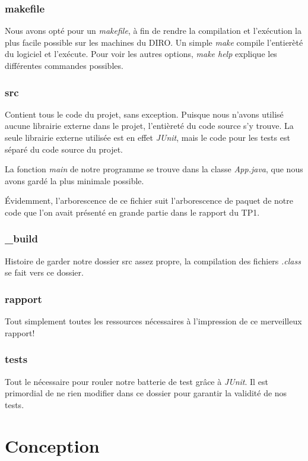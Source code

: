 \documentclass[letter,french]{report}
\begin{document}
	\subsubsection*{makefile}
	Nous avons opté pour un \emph{makefile}, à fin de rendre la compilation et l'exécution
	la plus facile possible sur les machines du DIRO. Un simple \emph{make} compile
	l'entierèté du logiciel et l'exécute. Pour voir les autres options, \emph{make help}
	explique les différentes commandes possibles.

	\subsubsection*{src}
  Contient tous le code du projet, sans exception. Puisque nous n'avons utilisé
  aucune librairie externe dans le projet, l'entièreté du code source s'y trouve.
  La seule librairie externe utilisée est en effet \emph{JUnit}, mais le code
  pour les tests est séparé du code source du projet.

  La fonction \emph{main} de notre programme se trouve dans la classe
  \emph{App.java}, que nous avons gardé la plus minimale possible.

  Évidemment, l'arborescence de ce fichier suit l'arborescence de paquet de
  notre code que l'on avait présenté en grande partie dans le rapport du TP1.

	\subsubsection*{\_build}
  Histoire de garder notre dossier src assez propre, la compilation des fichiers
  \emph{.class} se fait vers ce dossier.

	\subsubsection*{rapport}
  Tout simplement toutes les ressources nécessaires à l'impression de ce
  merveilleux rapport!

  \subsubsection*{tests}
  Tout le nécessaire pour rouler notre batterie de test grâce à \emph{JUnit}. Il
  est primordial de ne rien modifier dans ce dossier pour garantir la validité
  de nos tests.
	
	\section*{Conception}
\end{document}
